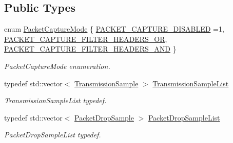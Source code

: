 \subsection*{Public Types}
\begin{DoxyCompactItemize}
\item 
enum \hyperlink{classns3_1_1PyViz_afefded0f19591a14d78d7031573cce86}{Packet\+Capture\+Mode} \{ \hyperlink{classns3_1_1PyViz_afefded0f19591a14d78d7031573cce86a564be1d28ff75020f21bc0c781637628}{P\+A\+C\+K\+E\+T\+\_\+\+C\+A\+P\+T\+U\+R\+E\+\_\+\+D\+I\+S\+A\+B\+L\+ED} =1, 
\hyperlink{classns3_1_1PyViz_afefded0f19591a14d78d7031573cce86a0435550003c45171077674b2c31e27d3}{P\+A\+C\+K\+E\+T\+\_\+\+C\+A\+P\+T\+U\+R\+E\+\_\+\+F\+I\+L\+T\+E\+R\+\_\+\+H\+E\+A\+D\+E\+R\+S\+\_\+\+OR}, 
\hyperlink{classns3_1_1PyViz_afefded0f19591a14d78d7031573cce86a89786eddf385177e4e1a5ea626b3b427}{P\+A\+C\+K\+E\+T\+\_\+\+C\+A\+P\+T\+U\+R\+E\+\_\+\+F\+I\+L\+T\+E\+R\+\_\+\+H\+E\+A\+D\+E\+R\+S\+\_\+\+A\+ND}
 \}\begin{DoxyCompactList}\small\item\em Packet\+Capture\+Mode enumeration. \end{DoxyCompactList}
\item 
typedef std\+::vector$<$ \hyperlink{structns3_1_1PyViz_1_1TransmissionSample}{Transmission\+Sample} $>$ \hyperlink{classns3_1_1PyViz_afef07a5e33f074ff5759906b90b885fb}{Transmission\+Sample\+List}
\begin{DoxyCompactList}\small\item\em Transmission\+Sample\+List typedef. \end{DoxyCompactList}\item 
typedef std\+::vector$<$ \hyperlink{structns3_1_1PyViz_1_1PacketDropSample}{Packet\+Drop\+Sample} $>$ \hyperlink{classns3_1_1PyViz_ad627eb91de7132e002dcd50e9d9248cd}{Packet\+Drop\+Sample\+List}
\begin{DoxyCompactList}\small\item\em Packet\+Drop\+Sample\+List typedef. \end{DoxyCompactList}\end{DoxyCompactItemize}
